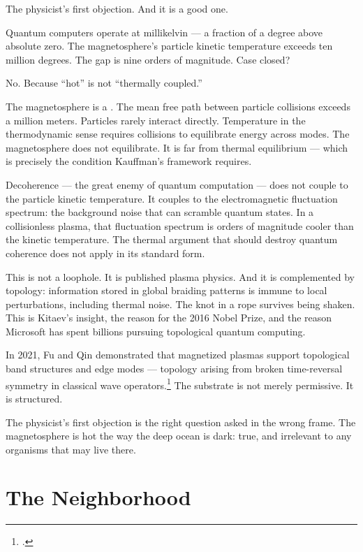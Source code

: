 The physicist's first objection. And it is a good one.

Quantum computers operate at millikelvin --- a fraction of a degree above absolute zero. The magnetosphere's particle kinetic temperature exceeds ten million degrees. The gap is nine orders of magnitude. Case closed?

No. Because ``hot'' is not ``thermally coupled.''

The magnetosphere is a . The mean free path between particle collisions exceeds a million meters. Particles rarely interact directly. Temperature in the thermodynamic sense requires collisions to equilibrate energy across modes. The magnetosphere does not equilibrate. It is far from thermal equilibrium --- which is precisely the condition Kauffman's framework requires.

Decoherence --- the great enemy of quantum computation --- does not couple to the particle kinetic temperature. It couples to the electromagnetic fluctuation spectrum: the background noise that can scramble quantum states. In a collisionless plasma, that fluctuation spectrum is orders of magnitude cooler than the kinetic temperature. The thermal argument that should destroy quantum coherence does not apply in its standard form.

This is not a loophole. It is published plasma physics. And it is complemented by topology: information stored in global braiding patterns is immune to local perturbations, including thermal noise. The knot in a rope survives being shaken. This is Kitaev's insight, the reason for the 2016 Nobel Prize, and the reason Microsoft has spent billions pursuing topological quantum computing.

In 2021, Fu and Qin demonstrated that magnetized plasmas support topological band structures and edge modes --- topology arising from broken time-reversal symmetry in classical wave operators.\footcite{fu2021} The substrate is not merely permissive. It is structured.

The physicist's first objection is the right question asked in the wrong frame. The magnetosphere is hot the way the deep ocean is dark: true, and irrelevant to any organisms that may live there.


\section*{The Neighborhood}
\label{pos32:the-neighborhood}

